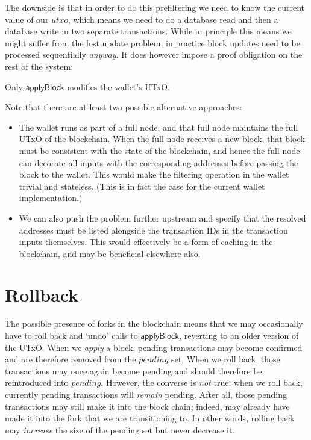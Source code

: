 \documentclass{article}
\theoremstyle{definition}{
  \newtheorem{lemma}{Lemma}[section] %
  \newtheorem{definition}[lemma]{Definition}
}
\theoremstyle{theorem}{
  \newtheorem{invariant}[lemma]{Invariant}
  \newtheorem{proofobligation}[lemma]{Proof Obligation}
}
\numberwithin{equation}{lemma}
\begin{document}
The downside is that in order to do this prefiltering we need to know the
current value of our $utxo$, which means we need to do a database read and then
a database write in two separate transactions. While in principle this means
we might suffer from the lost update problem, in practice block updates need to
be processed sequentially \emph{anyway}. It does however impose a proof
obligation on the rest of the system:

\begin{proofobligation}
Only $\mathsf{applyBlock}$ modifies the wallet's UTxO.
\end{proofobligation}

Note that there are at least two possible alternative approaches:

\begin{itemize}
\item The wallet runs as part of a full node, and that full node maintains
the full UTxO of the blockchain. When the full node receives a new block,
that block must be consistent with the state of the blockchain, and hence
the full node can decorate all inputs with the corresponding addresses before
passing the block to the wallet. This would make the filtering operation in
the wallet trivial and stateless. (This is in fact the case for the current
wallet implementation.)
\item We can also push the problem further upstream and specify that the
resolved addresses must be listed alongside the transaction IDs in the
transaction inputs themselves. This would effectively be a form of caching
in the blockchain, and may be beneficial elsewhere also.
\end{itemize}

\section{Rollback}
\label{sec:rollback}

The possible presence of forks in the blockchain means that we may occasionally
have to roll back and `undo' calls to $\mathsf{applyBlock}$, reverting to an
older version of the UTxO. When we \emph{apply} a block, pending transactions
may become confirmed and are therefore removed from the $\mathit{pending}$ set.
When we roll back, those transactions may once again become pending and should
therefore be reintroduced into $\mathit{pending}$. However, the converse is
\emph{not} true: when we roll back, currently pending transactions will
\emph{remain} pending. After all, those pending transactions may still make it
into the block chain; indeed, may already have made it into the fork that we are
transitioning to. In other words, rolling back may \emph{increase} the size of
the pending set but never decrease it.
\end{document}

